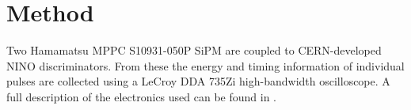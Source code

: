 \section{Method}


Two Hamamatsu MPPC S10931-050P SiPM are coupled to CERN-developed NINO discriminators. From these the energy and timing information of individual pulses are collected using a LeCroy DDA 735Zi high-bandwidth oscilloscope. A full description of the electronics used can be found in \cite{arron_Meyer_Pauwels_Lecoq_2012}.